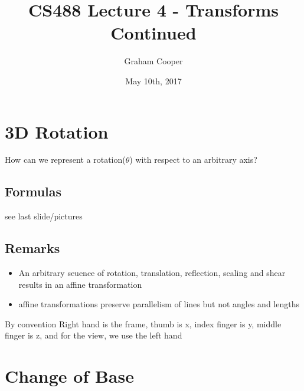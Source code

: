 \documentclass[12pt]{article}
\title{\vspace{-15ex}CS488 Lecture 4 - Transforms Continued\vspace{-1ex}}
\date{May 10th, 2017}
\author{Graham Cooper}
\begin{document}
	\maketitle
	
	\section*{3D Rotation}
	How can we represent a rotation($\theta$) with respect to an arbitrary axis?\\
	\subsection*{Formulas}
	
	see last slide/pictures\\
	
	\subsection*{Remarks}
	\begin{itemize}
		\item An arbitrary seuence of rotation, translation, reflection, scaling and shear results in an affine transformation
		\item affine transformations preserve parallelism of lines but not angles and lengths
	\end{itemize}

	By convention Right hand is the frame, thumb is x, index finger is y, middle finger is z, and for the view, we use the left hand\\
	
	\section*{Change of Base}
	
	
	
\end{document}
